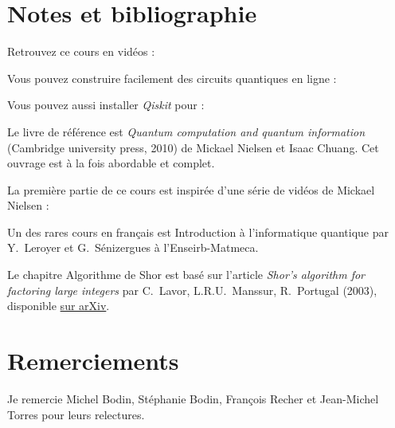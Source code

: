 
\clearemptydoublepage
\pagestyle{empty}\thispagestyle{empty}

\vspace*{\fill}

\section*{Notes et bibliographie}

Retrouvez ce cours en vidéos : 

\medskip

Vous pouvez construire facilement des circuits quantiques en ligne :

Vous pouvez aussi installer \emph{Qiskit} pour \Python{}:

\medskip

Le livre de référence est \emph{Quantum computation and quantum information} (Cambridge university press, 2010) de Mickael Nielsen et Isaac Chuang. Cet ouvrage est à la fois abordable et complet.

\medskip

La première partie de ce cours est inspirée d'une série de vidéos de Mickael Nielsen :

\medskip

Un des rares cours en français est \og{}Introduction à l'informatique quantique\fg{} par Y.~Leroyer et G.~Sénizergues
à l'Enseirb-Matmeca.

\medskip

Le chapitre \og{}Algorithme de Shor\fg{} est basé sur l'article \emph{Shor's algorithm for factoring large integers} par C.~Lavor, L.R.U.~Manssur, R.~Portugal (2003), disponible \href{https://arxiv.org/abs/quant-ph/0303175}{sur arXiv}.


\section*{Remerciements}

Je remercie Michel Bodin, Stéphanie Bodin, François Recher et Jean-Michel Torres pour leurs relectures.






